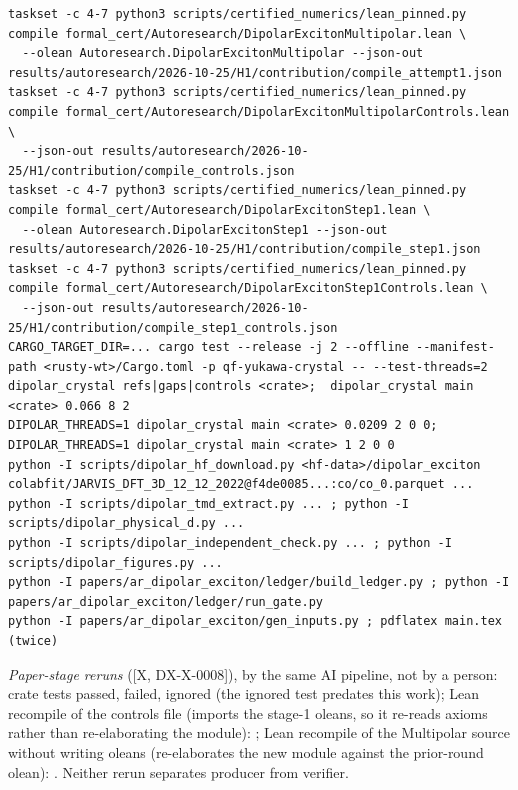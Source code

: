 \documentclass[11pt]{article}
\theoremstyle{remark}
\newcommand{\tier}[1]{\textsf{[#1]}}
\begin{document}
\begin{lstlisting}[basicstyle=\ttfamily\scriptsize]
taskset -c 4-7 python3 scripts/certified_numerics/lean_pinned.py compile formal_cert/Autoresearch/DipolarExcitonMultipolar.lean \
  --olean Autoresearch.DipolarExcitonMultipolar --json-out results/autoresearch/2026-10-25/H1/contribution/compile_attempt1.json
taskset -c 4-7 python3 scripts/certified_numerics/lean_pinned.py compile formal_cert/Autoresearch/DipolarExcitonMultipolarControls.lean \
  --json-out results/autoresearch/2026-10-25/H1/contribution/compile_controls.json
taskset -c 4-7 python3 scripts/certified_numerics/lean_pinned.py compile formal_cert/Autoresearch/DipolarExcitonStep1.lean \
  --olean Autoresearch.DipolarExcitonStep1 --json-out results/autoresearch/2026-10-25/H1/contribution/compile_step1.json
taskset -c 4-7 python3 scripts/certified_numerics/lean_pinned.py compile formal_cert/Autoresearch/DipolarExcitonStep1Controls.lean \
  --json-out results/autoresearch/2026-10-25/H1/contribution/compile_step1_controls.json
CARGO_TARGET_DIR=... cargo test --release -j 2 --offline --manifest-path <rusty-wt>/Cargo.toml -p qf-yukawa-crystal -- --test-threads=2
dipolar_crystal refs|gaps|controls <crate>;  dipolar_crystal main <crate> 0.066 8 2
DIPOLAR_THREADS=1 dipolar_crystal main <crate> 0.0209 2 0 0;  DIPOLAR_THREADS=1 dipolar_crystal main <crate> 1 2 0 0
python -I scripts/dipolar_hf_download.py <hf-data>/dipolar_exciton colabfit/JARVIS_DFT_3D_12_12_2022@f4de0085...:co/co_0.parquet ...
python -I scripts/dipolar_tmd_extract.py ... ; python -I scripts/dipolar_physical_d.py ...
python -I scripts/dipolar_independent_check.py ... ; python -I scripts/dipolar_figures.py ...
python -I papers/ar_dipolar_exciton/ledger/build_ledger.py ; python -I papers/ar_dipolar_exciton/ledger/run_gate.py
python -I papers/ar_dipolar_exciton/gen_inputs.py ; pdflatex main.tex (twice)
\end{lstlisting}
\emph{Paper-stage reruns} (\tier{X, DX-X-0008}), by the same AI pipeline, not by a person: crate tests
\DXTestsPassed{} passed, \DXTestsFailed{} failed, \DXTestsIgnored{} ignored (the ignored test predates this work); Lean
recompile of the controls file (imports the stage-1 oleans, so it re-reads axioms rather than re-elaborating the module):
\DXRecompileCtl; Lean recompile of the Multipolar source without writing oleans (re-elaborates the new module against the prior-round
olean): \DXRecompileSrc. Neither rerun separates producer from verifier.
\end{document}
